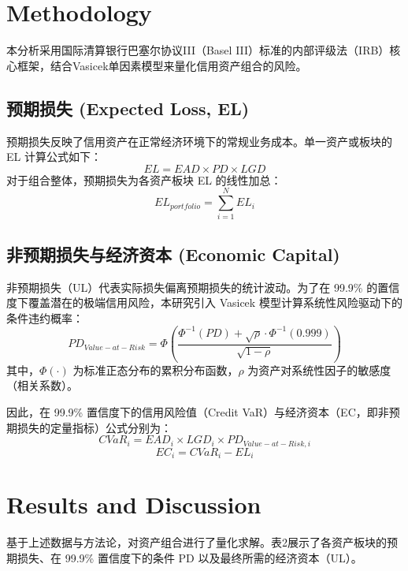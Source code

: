 \documentclass[12pt]{article}
\begin{document}

\section{Methodology}
本分析采用国际清算银行巴塞尔协议III（Basel III）标准的内部评级法（IRB）核心框架，结合Vasicek单因素模型来量化信用资产组合的风险。

\subsection{预期损失 (Expected Loss, EL)}
预期损失反映了信用资产在正常经济环境下的常规业务成本。单一资产或板块的 EL 计算公式如下：
\begin{equation}
EL = EAD \times PD \times LGD
\end{equation}
对于组合整体，预期损失为各资产板块 EL 的线性加总：
\begin{equation}
EL_{portfolio} = \sum_{i=1}^{N} EL_i
\end{equation}

\subsection{非预期损失与经济资本 (Economic Capital)}
非预期损失（UL）代表实际损失偏离预期损失的统计波动。为了在 99.9\% 的置信度下覆盖潜在的极端信用风险，本研究引入 Vasicek 模型计算系统性风险驱动下的条件违约概率：
\begin{equation}
PD_{Value-at-Risk} = \Phi \left( \frac{\Phi^{-1}(PD) + \sqrt{\rho} \cdot \Phi^{-1}(0.999)}{\sqrt{1 - \rho}} \right)
\end{equation}
其中，$\Phi(\cdot)$ 为标准正态分布的累积分布函数，$\rho$ 为资产对系统性因子的敏感度（相关系数）。

因此，在 99.9\% 置信度下的信用风险值（Credit VaR）与经济资本（EC，即非预期损失的定量指标）公式分别为：
\begin{equation}
CVaR_i = EAD_i \times LGD_i \times PD_{Value-at-Risk, i}
\end{equation}
\begin{equation}
EC_i = CVaR_i - EL_i
\end{equation}


\section{Results and Discussion}
基于上述数据与方法论，对资产组合进行了量化求解。表2展示了各资产板块的预期损失、在 99.9\% 置信度下的条件 PD 以及最终所需的经济资本（UL）。
\end{document}
